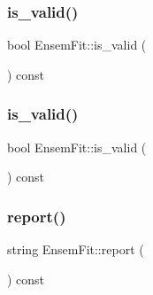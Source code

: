 \subsubsection{\texorpdfstring{is\_valid()}{is\_valid()}\hspace{0.1cm}{\footnotesize\ttfamily [1/2]}}
{\footnotesize\ttfamily bool Ensem\+Fit\+::is\+\_\+valid (\begin{DoxyParamCaption}{ }\end{DoxyParamCaption}) const\hspace{0.3cm}{\ttfamily [inline]}}

\mbox{\label{classEnsemFit_a5f154286b15fe9dbfe74fd5e00b4ed11}} 
\subsubsection{\texorpdfstring{is\_valid()}{is\_valid()}\hspace{0.1cm}{\footnotesize\ttfamily [2/2]}}
{\footnotesize\ttfamily bool Ensem\+Fit\+::is\+\_\+valid (\begin{DoxyParamCaption}{ }\end{DoxyParamCaption}) const\hspace{0.3cm}{\ttfamily [inline]}}

\mbox{\label{classEnsemFit_a699cb4ec2b3d2107c67aaed422414f4d}} 
\subsubsection{\texorpdfstring{report()}{report()}\hspace{0.1cm}{\footnotesize\ttfamily [1/2]}}
{\footnotesize\ttfamily string Ensem\+Fit\+::report (\begin{DoxyParamCaption}{ }\end{DoxyParamCaption}) const}

